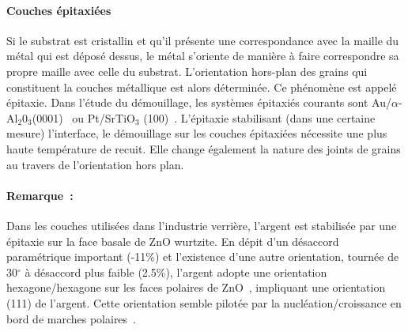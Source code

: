 \paragraph*{Couches épitaxiées} Si le substrat est cristallin et qu'il présente une correspondance avec la maille du métal qui est déposé dessus, le métal s'oriente de manière à faire correspondre sa propre maille avec celle du substrat. L'orientation hors-plan des grains qui constituent la couches métallique est alors déterminée. Ce phénomène est appelé épitaxie. Dans l'étude du démouillage, les systèmes épitaxiés courants sont Au/$\alpha$-Al$_2$0$_3$(0001)~\cite{kosinova2014role} ou Pt/SrTiO$_3$ (100)~\cite{atiya2014solid}. L'épitaxie stabilisant (dans une certaine mesure) l'interface, le démouillage sur les couches épitaxiées nécessite une plus haute température de recuit. Elle change également la nature des joints de grains au travers de l'orientation hors plan.\par 

\paragraph*{Remarque~:} Dans les couches utilisées dans l'industrie verrière, l'argent est stabilisée par une épitaxie sur la face basale de ZnO wurtzite. En dépit d'un désaccord paramétrique important (-11\%) et l'existence d'une autre orientation, tournée de 30$^\circ$ à désaccord plus faible  (2.5\%), l'argent adopte une orientation hexagone/hexagone sur les faces polaires de ZnO~\cite{jedrecy05,jedrecy05b}, impliquant une orientation (111) de l'argent. Cette orientation semble pilotée par la nucléation/croissance en bord de marches polaires~\cite{chernyshevat}.


